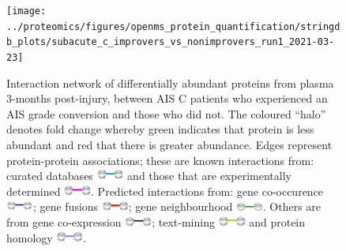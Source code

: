 \documentclass[
]{article}
\begin{document}
\begin{figure}
\texttt{[image: ../proteomics/figures/openms\_protein\_quantification/stringdb\_plots/subacute\_c\_improvers\_vs\_nonimprovers\_run1\_2021-03-23]} \caption{Interaction network of differentially abundant proteins from plasma 3-months post-injury, between AIS C patients who experienced an AIS grade conversion and those who did not. The coloured ``halo'' denotes fold change whereby green indicates that protein is less abundant and red that there is greater abundance. Edges represent protein-protein associations; these are known interactions from: curated databases \includegraphics[width=0.08\textwidth,height=0.02\textheight]{Images/stringdb_curated_db.png} and those that are experimentally determined \includegraphics[width=0.08\textwidth,height=0.02\textheight]{Images/stringdb_experimentally_determined.png}. Predicted interactions from: gene co-occurence \includegraphics[width=0.08\textwidth,height=0.02\textheight]{Images/stringdb_gene_co-occurrence.png}; gene fusions \includegraphics[width=0.08\textwidth,height=0.02\textheight]{Images/stringdb_gene_fusions.png}; gene neighbourhood \includegraphics[width=0.08\textwidth,height=0.02\textheight]{Images/stringdb_gene_neighbour.png}. Others are from gene co-expression \includegraphics[width=0.08\textwidth,height=0.02\textheight]{Images/stringdb_co-expression.png}; text-mining \includegraphics[width=0.08\textwidth,height=0.02\textheight]{Images/stringdb_text_mining.png} and protein homology \includegraphics[width=0.08\textwidth,height=0.02\textheight]{Images/stringdb_protein-homology.png}.}\label{fig:openms-stringdb-sub-cs}
\end{figure}
\end{document}
